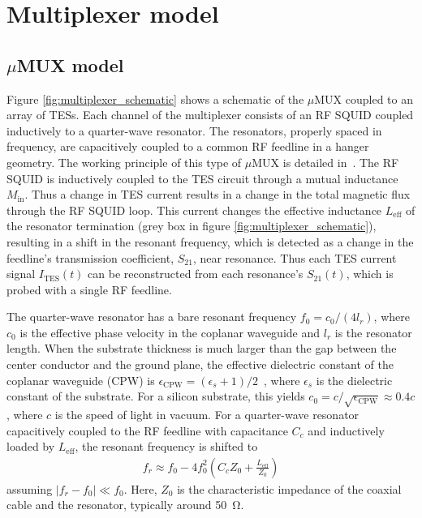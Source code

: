 \documentclass[10pt]{iopart}
\newcommand{\uMUX}{$\mu$MUX\xspace}
\begin{document}
\section{Multiplexer model}
\label{sec:model}

\subsection{\texorpdfstring{\uMUX model}{muMUX model}}
\label{model:uMUX_model}


Figure \ref{fig:multiplexer_schematic} shows a schematic of the \uMUX coupled to an array of TESs. Each channel of the multiplexer consists of an RF SQUID coupled inductively to a quarter-wave resonator. The resonators, properly spaced in frequency, are capacitively coupled to a common RF feedline in a hanger geometry. The working principle of this type of $\mu$MUX is detailed in~\cite{mates_microwave_2011}. The RF SQUID is inductively coupled to the TES circuit through a mutual inductance $M_{\text{in}}$. Thus a change in TES current results in a change in the total magnetic flux through the RF SQUID loop. This current changes the effective inductance $L_{\text{eff}}$ of the resonator termination (grey box in figure \ref{fig:multiplexer_schematic}), resulting in a shift in the resonant frequency, which is detected as a change in the feedline's transmission coefficient, $S_{21}$, near resonance. Thus each TES current signal $I_{\text{TES}}(t)$ can be reconstructed from each resonance's $S_{21}(t)$, which is probed with a single RF feedline.


The quarter-wave resonator has a bare resonant frequency $f_0 = c_0 / (4 l_r)$, where $c_0$ is the effective phase velocity in the coplanar waveguide and $l_r$ is the resonator length. When the substrate thickness is much larger than the gap between the center conductor and the ground plane, the effective dielectric constant of the coplanar waveguide (CPW) is $\epsilon_{\mathrm{CPW}} = (\epsilon_s + 1)/2$~\cite{steer_microwave_2019}, where $\epsilon_s$ is the dielectric constant of the substrate. For a silicon substrate, this yields $c_0 = c / \sqrt{\epsilon_{\mathrm{CPW}}} \approx 0.4c$, where $c$ is the speed of light in vacuum. For a quarter-wave resonator capacitively coupled to the RF feedline with capacitance $C_c$ and inductively loaded by $L_{\text{eff}}$, the resonant frequency is shifted to~\cite{kempf_design_2017}
\begin{gather} \label{eq:f_res_vs_L_T}
    f_r \approx f_0 - 4 f_0^2 \left( C_c Z_0 + \frac{L_{\text{eff}}}{Z_0} \right)
\end{gather}
assuming $|f_r - f_0| \ll f_0$. Here, $Z_0$ is the characteristic impedance of the coaxial cable and the resonator, typically around \qty{50}{\ohm}.
\end{document}
